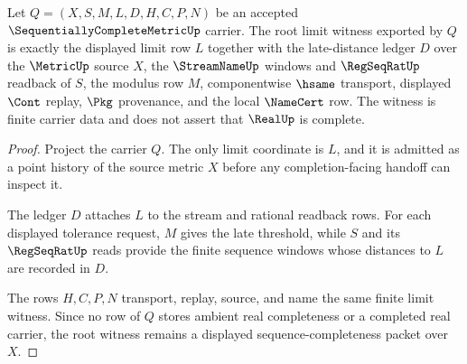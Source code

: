\begin{theorem}
\label{thm:sequentially-complete-metric-root-limit-witness}
Let $Q=(X,S,M,L,D,H,C,P,N)$ be an accepted $\SequentiallyCompleteMetricUp$ carrier. The root limit witness exported by $Q$ is exactly the displayed limit row $L$ together with the late-distance ledger $D$ over the $\MetricUp$ source $X$, the $\StreamNameUp$ windows and $\RegSeqRatUp$ readback of $S$, the modulus row $M$, componentwise $\hsame$ transport, displayed $\Cont$ replay, $\Pkg$ provenance, and the local $\NameCert$ row. The witness is finite carrier data and does not assert that $\RealUp$ is complete.
\end{theorem}
\begin{proof}
Project the carrier $Q$. The only limit coordinate is $L$, and it is admitted as a point history of the source metric $X$ before any completion-facing handoff can inspect it.

The ledger $D$ attaches $L$ to the stream and rational readback rows. For each displayed tolerance request, $M$ gives the late threshold, while $S$ and its $\RegSeqRatUp$ reads provide the finite sequence windows whose distances to $L$ are recorded in $D$.

The rows $H,C,P,N$ transport, replay, source, and name the same finite limit witness. Since no row of $Q$ stores ambient real completeness or a completed real carrier, the root witness remains a displayed sequence-completeness packet over $X$.
\end{proof}

